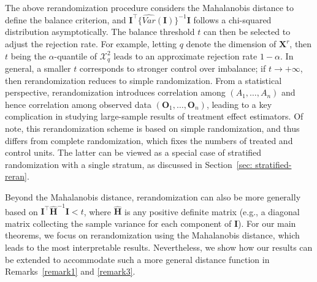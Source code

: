 \documentclass[12pt]{article}
\newcommand{\bX}{\boldsymbol{X}}\newcommand{\bO}{\boldsymbol{O}}
\newcommand{\bI}{\boldsymbol{I}}
\begin{document}
The above rerandomization procedure considers the Mahalanobis distance to define the balance criterion, and $\bI^\top \{\widehat{Var}(\bI)\}^{-1} \bI$ follows a chi-squared distribution asymptotically. The balance threshold $t$ can then be selected to adjust the rejection rate. For example, letting $q$ denote the dimension of $\bX^r$, then $t$ being the $\alpha$-quantile of $\mathcal{X}^2_q$ leads to an approximate rejection rate $1-\alpha$. In general, a smaller $t$ corresponds to stronger control over imbalance; if $t\rightarrow +\infty$, then rerandomization reduces to simple randomization. From a statistical perspective, rerandomization introduces correlation among $(A_1,\dots, A_n)$ and hence correlation among observed data $(\bO_1,\dots,\bO_n)$, leading to a key complication in studying large-sample results of treatment effect estimators.
{Of note, this rerandomization scheme is based on simple randomization, and thus differs from complete randomization, which fixes the numbers of treated and control units. The latter can be viewed as a special case of stratified randomization with a single stratum, as discussed in Section~\ref{sec: stratified-reran}.}

Beyond the Mahalanobis distance, rerandomization can also be more generally based on $\bI^\top \widehat{\mathbf{H}}^{-1} \bI < t$, where $\widehat{\mathbf{H}}$ is any positive definite matrix (e.g., a diagonal matrix collecting the sample variance for each component of $\bI$). 
For our main theorems, we focus on rerandomization using the Mahalanobis distance, which leads to the most interpretable results. Nevertheless, we show how our results can be extended to accommodate such a more general distance function in Remarks~\ref{remark1} and \ref{remark3}. %


\end{document}
